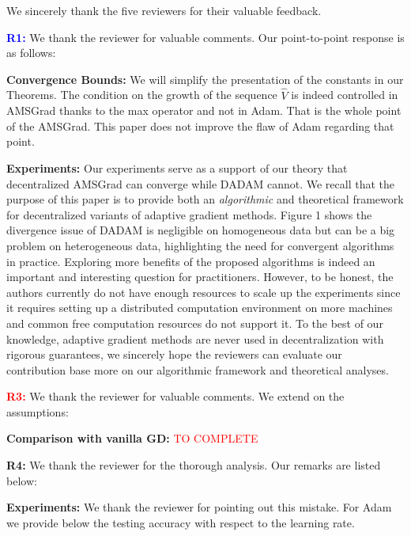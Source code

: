 \documentclass{article}
\begin{document}
We sincerely thank the five reviewers for their valuable feedback.


\vspace{0.01in}

\textbf{\textcolor{blue}{R1:}} We thank the reviewer for valuable comments. Our point-to-point response is as follows:\vspace{-5pt}

\textbf{Convergence Bounds:} 
We will simplify the presentation of the constants in our Theorems.
The condition on the growth of the sequence $\hat{V}$ is indeed controlled in AMSGrad thanks to the max operator and not in Adam. That is the whole point of the AMSGrad. This paper does not improve the flaw of Adam regarding that point.

 \textbf{Experiments:} 
 Our experiments serve as a support of our theory that decentralized AMSGrad can converge while DADAM cannot.
We recall that the purpose of this paper is to provide both an \emph{algorithmic} and {theoretical} framework for decentralized variants of adaptive gradient methods. 
 Figure 1 shows the divergence issue of DADAM is negligible on homogeneous data but can be a big problem on heterogeneous data, highlighting the need for convergent algorithms in practice. 
 Exploring more benefits of the proposed algorithms is indeed an important and interesting question for practitioners. However, to be honest, the authors currently do not have enough  resources to scale up the experiments since it requires setting up a distributed computation environment on more machines and common free computation resources do not support it. To the best of our knowledge, adaptive gradient methods are never used in decentralization with rigorous guarantees, we sincerely hope the reviewers can evaluate our contribution base more on our algorithmic framework and theoretical analyses.
\vspace{0.01in}


\textbf{\textcolor{red}{R3:}} We thank the reviewer for valuable comments. We extend on the assumptions:\vspace{-5pt}

\textbf{Comparison with vanilla GD:} \textcolor{red}{TO COMPLETE}


\vspace{0.01in}
\textbf{\textcolor{green!50!black}{R4:}} We thank the reviewer for the thorough analysis. Our remarks are listed below:\vspace{-5pt}

\textbf{Experiments:} 
We thank the reviewer for pointing out this mistake.
For Adam we provide below the testing accuracy with respect to the learning rate.
\end{document}
